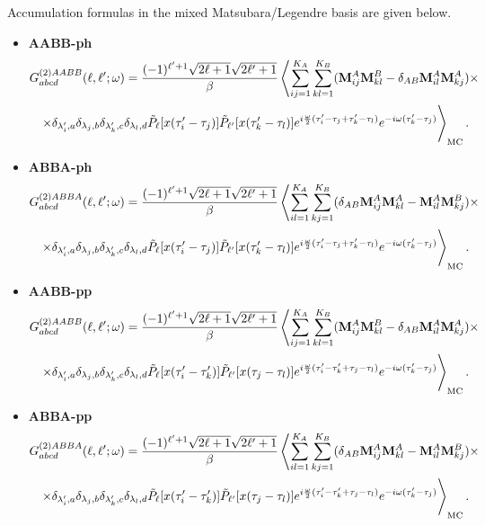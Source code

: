 \documentclass[a4paper,12pt]{article}
\renewcommand{\t}{\ensuremath{\tau}}
\newcommand{\w}{\ensuremath{\omega}}
\begin{document}
Accumulation formulas in the mixed Matsubara/Legendre basis are given below.
\begin{itemize}
	\item \textbf{AABB-ph}
	\begin{multline}
		G^{(2)AABB}_{abcd}(\ell,\ell';\w) =
		\frac{(-1)^{\ell'+1}\sqrt{2\ell+1}\sqrt{2\ell'+1}}{\beta}\left\langle
		\sum_{ij=1}^{K_A}\sum_{kl=1}^{K_B}
		(\mathbf{M}^A_{ij} \mathbf{M}^B_{kl} - \delta_{AB}\mathbf{M}^A_{il} \mathbf{M}^A_{kj})
		\times\right.\\\left.\times
		\delta_{\lambda'_i,a} \delta_{\lambda_j,b}\delta_{\lambda'_k,c} \delta_{\lambda_l,d}
		\tilde P_\ell[x(\t'_i-\t_j)] \tilde P_{\ell'}[x(\t'_k-\t_l)]
		e^{i\frac{\w}{2}(\t'_i-\t_j+\t'_k-\t_l)} e^{-i\w(\t'_k-\t_j)}
		\vphantom{\sum_{ijkl=1}^K} \right\rangle_\mathrm{MC}.
	\end{multline}
	\item \textbf{ABBA-ph}
	\begin{multline}
		G^{(2)ABBA}_{abcd}(\ell,\ell';\w) =
		\frac{(-1)^{\ell'+1}\sqrt{2\ell+1}\sqrt{2\ell'+1}}{\beta}\left\langle
		\sum_{il=1}^{K_A}\sum_{kj=1}^{K_B}
		(\delta_{AB}\mathbf{M}^A_{ij} \mathbf{M}^A_{kl} - \mathbf{M}^A_{il} \mathbf{M}^B_{kj})
		\times\right.\\\left.\times
		\delta_{\lambda'_i,a} \delta_{\lambda_j,b}\delta_{\lambda'_k,c} \delta_{\lambda_l,d}
		\tilde P_\ell[x(\t'_i-\t_j)] \tilde P_{\ell'}[x(\t'_k-\t_l)]
		e^{i\frac{\w}{2}(\t'_i-\t_j+\t'_k-\t_l)} e^{-i\w(\t'_k-\t_j)}
		\vphantom{\sum_{ijkl=1}^K} \right\rangle_\mathrm{MC}.
	\end{multline}
	\item \textbf{AABB-pp}
	\begin{multline}
		G^{(2)AABB}_{abcd}(\ell,\ell';\w) =
		\frac{(-1)^{\ell'+1}\sqrt{2\ell+1}\sqrt{2\ell'+1}}{\beta}\left\langle
		\sum_{ij=1}^{K_A}\sum_{kl=1}^{K_B}
		(\mathbf{M}^A_{ij} \mathbf{M}^B_{kl} - \delta_{AB}\mathbf{M}^A_{il} \mathbf{M}^A_{kj})
		\times\right.\\\left.\times
		\delta_{\lambda'_i,a} \delta_{\lambda_j,b}\delta_{\lambda'_k,c} \delta_{\lambda_l,d}
		\tilde P_\ell[x(\t'_i-\t'_k)] \tilde P_{\ell'}[x(\t_j-\t_l)]
		e^{i\frac{\w}{2}(\t'_i-\t'_k+\t_j-\t_l)} e^{-i\w(\t'_k-\t_j)}
		\vphantom{\sum_{ijkl=1}^K} \right\rangle_\mathrm{MC}.
	\end{multline}
	\item \textbf{ABBA-pp}
	\begin{multline}
		G^{(2)ABBA}_{abcd}(\ell,\ell';\w) =
		\frac{(-1)^{\ell'+1}\sqrt{2\ell+1}\sqrt{2\ell'+1}}{\beta}\left\langle
		\sum_{il=1}^{K_A}\sum_{kj=1}^{K_B}
		(\delta_{AB}\mathbf{M}^A_{ij} \mathbf{M}^A_{kl} - \mathbf{M}^A_{il} \mathbf{M}^B_{kj})
		\times\right.\\\left.\times
		\delta_{\lambda'_i,a} \delta_{\lambda_j,b}\delta_{\lambda'_k,c} \delta_{\lambda_l,d}
		\tilde P_\ell[x(\t'_i-\t'_k)] \tilde P_{\ell'}[x(\t_j-\t_l)]
		e^{i\frac{\w}{2}(\t'_i-\t'_k+\t_j-\t_l)} e^{-i\w(\t'_k-\t_j)}
		\vphantom{\sum_{ijkl=1}^K} \right\rangle_\mathrm{MC}.
	\end{multline}
\end{itemize}
\end{document}
